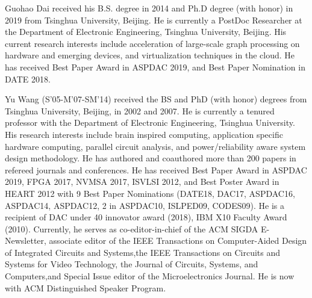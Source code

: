 \documentclass[journal]{IEEEtran}
\begin{document}
\begin{IEEEbiography}{Guohao Dai}
  \footnotesize
  received his B.S. degree in 2014 and Ph.D degree (with honor) in 2019 from Tsinghua University, Beijing. He is currently a PostDoc Researcher at the Department of Electronic Engineering, Tsinghua University, Beijing. His current research interests include acceleration of large-scale graph processing on hardware and emerging devices, and virtualization techniques in the cloud. He has received Best Paper Award in ASPDAC 2019, and Best Paper Nomination in DATE 2018.
\end{IEEEbiography}

\begin{IEEEbiography}{Yu Wang}
  \footnotesize
   (S’05-M’07-SM’14) received the BS and   PhD (with honor) degrees from Tsinghua University,   Beijing, in 2002 and 2007. He is currently a tenured   professor with the Department of Electronic Engineering, Tsinghua University. His research interests   include brain inspired computing, application specific hardware computing, parallel circuit analysis,   and power/reliability aware system design methodology. He has authored and coauthored more than 200   papers in refereed journals and conferences. He has   received Best Paper Award in ASPDAC 2019, FPGA   2017, NVMSA 2017, ISVLSI 2012, and Best Poster Award in HEART 2012   with 9 Best Paper Nominations (DATE18, DAC17, ASPDAC16, ASPDAC14,   ASPDAC12, 2 in ASPDAC10, ISLPED09, CODES09). He is a recipient of   DAC under 40 innovator award (2018), IBM X10 Faculty Award (2010).  
  Currently,   he serves as co-editor-in-chief of the ACM SIGDA E-Newsletter, associate   editor of the IEEE Transactions on Computer-Aided Design of Integrated   Circuits and Systems,the IEEE Transactions on Circuits and Systems for Video   Technology, the Journal of Circuits, Systems, and Computers,and Special Issue   editor of the Microelectronics Journal. He is now with ACM Distinguished   Speaker Program.   
\end{IEEEbiography}
\end{document}
